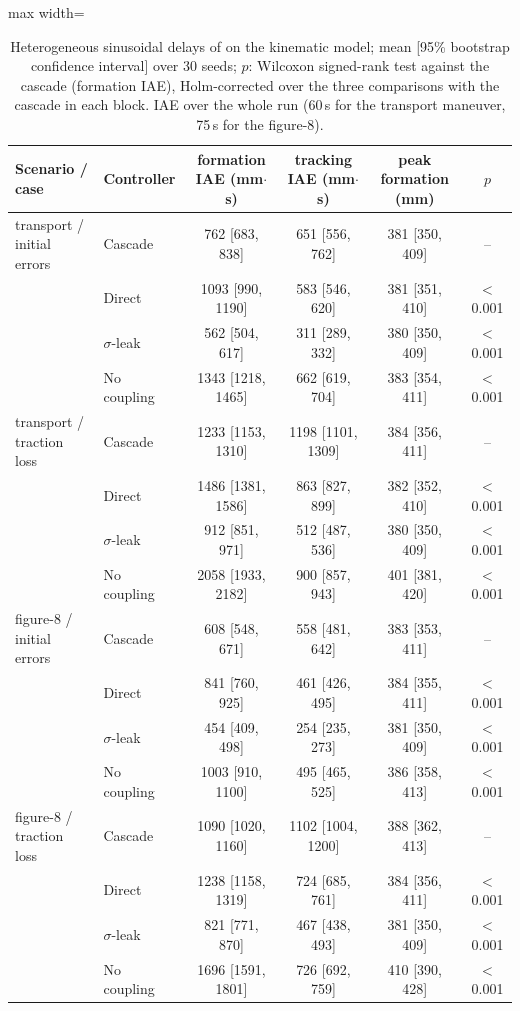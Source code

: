 \begin{table}[!t]\centering\footnotesize
\caption{Heterogeneous sinusoidal delays of \cite{peng2023} on the kinematic model; mean [95\% bootstrap confidence interval] over 30 seeds; $p$: Wilcoxon signed-rank test against the cascade (formation IAE), Holm-corrected over the three comparisons with the cascade in each block. IAE over the whole run (60\,s for the transport maneuver, 75\,s for the figure-8).}\label{tab:r1}
\begin{adjustbox}{max width=\textwidth}
\begin{tabular}{@{}llcccc@{}}\toprule
Scenario / case & Controller & formation IAE (mm$\cdot$s) & tracking IAE (mm$\cdot$s) & peak formation (mm) & $p$\\\midrule
transport / initial errors & Cascade & 762 [683, 838] & 651 [556, 762] & 381 [350, 409] & --\\
 & Direct & 1093 [990, 1190] & 583 [546, 620] & 381 [351, 410] & $<$0.001\\
 & $\sigma$-leak & 562 [504, 617] & 311 [289, 332] & 380 [350, 409] & $<$0.001\\
 & No coupling & 1343 [1218, 1465] & 662 [619, 704] & 383 [354, 411] & $<$0.001\\
\addlinespace
transport / traction loss & Cascade & 1233 [1153, 1310] & 1198 [1101, 1309] & 384 [356, 411] & --\\
 & Direct & 1486 [1381, 1586] & 863 [827, 899] & 382 [352, 410] & $<$0.001\\
 & $\sigma$-leak & 912 [851, 971] & 512 [487, 536] & 380 [350, 409] & $<$0.001\\
 & No coupling & 2058 [1933, 2182] & 900 [857, 943] & 401 [381, 420] & $<$0.001\\
\addlinespace
figure-8 / initial errors & Cascade & 608 [548, 671] & 558 [481, 642] & 383 [353, 411] & --\\
 & Direct & 841 [760, 925] & 461 [426, 495] & 384 [355, 411] & $<$0.001\\
 & $\sigma$-leak & 454 [409, 498] & 254 [235, 273] & 381 [350, 409] & $<$0.001\\
 & No coupling & 1003 [910, 1100] & 495 [465, 525] & 386 [358, 413] & $<$0.001\\
\addlinespace
figure-8 / traction loss & Cascade & 1090 [1020, 1160] & 1102 [1004, 1200] & 388 [362, 413] & --\\
 & Direct & 1238 [1158, 1319] & 724 [685, 761] & 384 [356, 411] & $<$0.001\\
 & $\sigma$-leak & 821 [771, 870] & 467 [438, 493] & 381 [350, 409] & $<$0.001\\
 & No coupling & 1696 [1591, 1801] & 726 [692, 759] & 410 [390, 428] & $<$0.001\\
\bottomrule\end{tabular}
\end{adjustbox}
\end{table}
